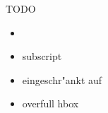 \documentclass[class=article, crop=false]{standalone}
\begin{document}
\begin{zettel}{TODO}
    \begin{itemize}
        \item \R
        \item subscript
        \item eingeschr"ankt auf
        \item overfull hbox
    \end{itemize}
\end{zettel}
\end{document}

